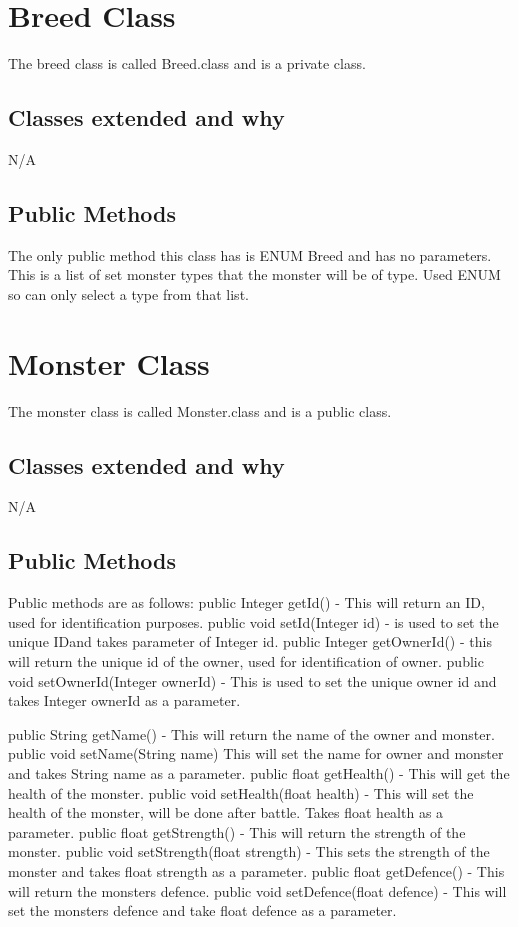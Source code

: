 \documentclass{project}
\begin{document}
\section{Breed Class}
The breed class is called Breed.class and is a private class.
\subsection{Classes extended and why}
N/A
\subsection{Public Methods} 
The only public method this class has is ENUM Breed and has no parameters. This is a list of set monster types that the monster will be of type. Used ENUM so can only select a type from that list.

\section{Monster Class}
The monster class is called Monster.class and is a public class.
\subsection{Classes extended and why}
N/A
\subsection{Public Methods}
Public methods are as follows:        
public Integer getId() - This will return an ID, used for identification purposes. public void setId(Integer id) - is used to set the unique IDand takes parameter of Integer id. public Integer getOwnerId() - this will return the unique id of the owner, used for identification of owner. public void setOwnerId(Integer ownerId) - This is used to set the unique owner id and takes Integer ownerId as a parameter.

public String getName() - This will return the name of the owner and monster. public void setName(String name) This will set the name for owner and monster and takes String name as a parameter.
public float getHealth() - This will get the health of the monster. public void setHealth(float health) - This will set the health of the monster, will be done after battle. Takes float health as a parameter.
public float getStrength() - This will return the strength of the monster. public void setStrength(float strength) - This sets the strength of the monster and takes float strength as a parameter.
public float getDefence() - This will return the monsters defence. public void setDefence(float defence) - This will set the monsters defence and take float defence as a parameter.
\end{document}
